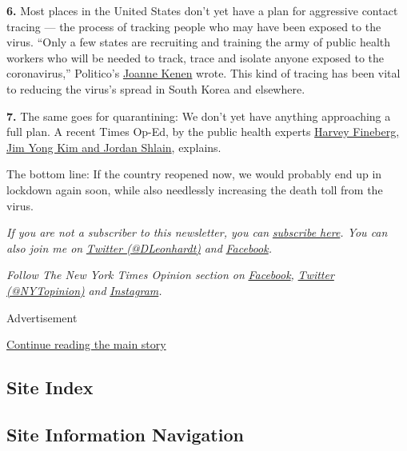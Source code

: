 \textbf{6.} Most places in the United States don't yet have a plan for
aggressive contact tracing --- the process of tracking people who may
have been exposed to the virus. ``Only a few states are recruiting and
training the army of public health workers who will be needed to track,
trace and isolate anyone exposed to the coronavirus,'' Politico's
\href{https://www.politico.com/news/2020/04/18/trump-reopen-country-coronavirus-193182}{Joanne
Kenen} wrote. This kind of tracing has been vital to reducing the
virus's spread in South Korea and elsewhere.

\textbf{7.} The same goes for quarantining: We don't yet have anything
approaching a full plan. A recent Times Op-Ed, by the public health
experts
\href{https://www.nytimes3xbfgragh.onion/2020/04/07/opinion/coronavirus-smart-quarantine.html}{Harvey
Fineberg, Jim Yong Kim and Jordan Shlain}, explains.

The bottom line: If the country reopened now, we would probably end up
in lockdown again soon, while also needlessly increasing the death toll
from the virus.

\emph{If you are not a subscriber to this newsletter, you can}
\href{https://www.nytimes3xbfgragh.onion/newsletters/david-leonhardt}{\emph{subscribe
here}}\emph{. You can also join me on}
\href{https://twitter.com/DLeonhardt}{\emph{Twitter (@DLeonhardt)}}
\emph{and}
\href{https://www.facebookcorewwwi.onion/DavidRLeonhardt/}{\emph{Facebook}}\emph{.}

\emph{Follow The New York Times Opinion section on}
\href{https://www.facebookcorewwwi.onion/nytopinion}{\emph{Facebook}}\emph{,}
\href{http://twitter.com/NYTOpinion}{\emph{Twitter (@NYTopinion)}}
\emph{and}
\href{https://www.instagram.com/nytopinion/}{\emph{Instagram}}\emph{.}

Advertisement

\protect\hyperlink{after-bottom}{Continue reading the main story}

\hypertarget{site-index}{%
\subsection{Site Index}\label{site-index}}

\hypertarget{site-information-navigation}{%
\subsection{Site Information
Navigation}\label{site-information-navigation}}

